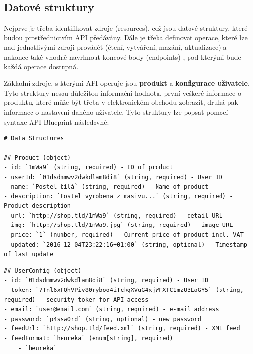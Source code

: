 \documentclass[FM,DP]{tulthesis}
\newenvironment{code}
    {\filbreak\captionsetup{type=listing}}{\filbreak}
\begin{document}
\subsection{Datové struktury}

Nejprve je třeba identifikovat zdroje (resources), což jsou datové struktury, které
budou prostřednictvím API předávány. Dále je třeba definovat operace, které lze nad 
jednotlivými zdroji provádět (čtení, vytváření, mazání, aktualizace) a nakonec také 
vhodně navrhnout koncové body (endpoints) \cite[strana~12]{api}, pod kterými bude každá 
operace dostupná.

Základní zdroje, s kterými API operuje jsou \textbf{produkt} a \textbf{konfigurace uživatele}. 
Tyto struktury nesou důležitou informační hodnotu, první veškeré informace o produktu, 
které může být třeba v elektronickém obchodu zobrazit, druhá pak informace o nastavení 
daného uživatele. Tyto struktury lze popsat pomocí syntaxe API Blueprint \cite[strana~131]{api}
následovně:

\begin{code}
\captionsetup{singlelinecheck=false,justification=raggedright}
\label{code:api-product}
\begin{verbatim}
# Data Structures

## Product (object)
- id: `1mWa9` (string, required) - ID of product
- userId: `01dsdmmwv2dwkdlam8di8` (string, required) - User ID
- name: `Postel bílá` (string, required) - Name of product
- description: `Postel vyrobena z masivu...` (string, required) - Product description
- url: `http://shop.tld/1mWa9` (string, required) - detail URL
- img: `http://shop.tld/1mWa9.jpg` (string, required) - image URL
- price: `1` (number, required) - Current price of product incl. VAT
- updated: `2016-12-04T23:22:16+01:00` (string, optional) - Timestamp of last update
\end{verbatim}
\end{code}

\begin{code}
\captionsetup{singlelinecheck=false,justification=raggedright}
\label{code:api-user}
\begin{verbatim}
## UserConfig (object)
- id: `01dsdmmwv2dwkdlam8di8` (string, required) - User ID
- token: `7Tnl6xPQhVPiv80ryboo4iTckqXVuG4xjWFXTC1mzU3EaGY5` (string, required) - security token for API access
- email: `user@email.com` (string, required) - e-mail address
- password: `p4ssw0rd` (string, optional) - new password
- feedUrl: `http://shop.tld/feed.xml` (string, required) - XML feed
- feedFormat: `heureka` (enum[string], required)
    - `heureka`
\end{verbatim}
\end{code}
\end{document}
